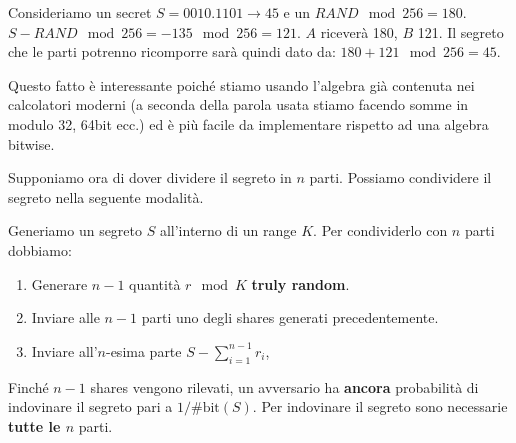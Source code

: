 \begin{example}
Consideriamo un secret $S=0010.1101\rightarrow 45$ e un $RAND\mod256=180$. $S-RAND\mod{256}=-135\mod{256}=121$. $A$ riceverà 180, $B$ 121. Il segreto che le parti potrenno ricomporre sarà quindi dato da: $180+121\mod{256}=45$.
\end{example}
\begin{remark}
Questo fatto è interessante poiché stiamo usando l'algebra già contenuta nei calcolatori moderni (a seconda della parola usata stiamo facendo somme in modulo 32, 64bit ecc.) ed è più facile da implementare rispetto ad una algebra bitwise.
\end{remark}
Supponiamo ora di dover dividere il segreto in $n$ parti. Possiamo condividere il segreto nella seguente modalità.
\begin{theorem}\label{thm:trivialsecret}
Generiamo un segreto $S$ all'interno di un range $K$. Per condividerlo con $n$ parti dobbiamo:
\begin{enumerate}
    \item Generare $n-1$ quantità $r\mod{K}$ \textbf{truly random}.
    \item Inviare alle $n-1$ parti uno degli shares generati precedentemente.
    \item Inviare all'$n$-esima parte $S-\sum_{i=1}^{n-1}{r_i}$,
\end{enumerate}
Finché $n-1$ shares vengono rilevati, un avversario ha \textbf{ancora} probabilità di indovinare il segreto pari a $1/\text{\#bit}(S)$. Per indovinare il segreto sono necessarie \textbf{tutte le $n$} parti.
\end{theorem}
